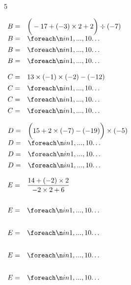 \documentclass[a4paper]{book}
\begin{document}
{\begin{exerciceNote}{5}
\begin{minipage}{0.30\linewidth}
            $\begin{array}{ll}
                B = & \bigg(-17+(-3)\times2+2\bigg)\div(-7) \\[1ex]
                B = & \points[10]\\[1ex]
                B = & \points[10]\\[1ex]
                B = & \points[10]
            \end{array}$
        \end{minipage}
        \hfill
        \begin{minipage}{0.30\linewidth}
            $\begin{array}{ll}
                C = & 13\times(-1)\times(-2)-(-12) \\[1ex]
                C = & \points[10] \\[1ex]
                C = & \points[10] \\[1ex]
                C = & \points[10]
            \end{array}$

            \vspace{1cm}

            $\begin{array}{ll}
                D = & \bigg(15+2\times(-7)-(-19)\bigg)\times(-5) \\[1ex]
                D = & \points[10]\\[1ex]
                D = & \points[10]\\[1ex]
                D = & \points[10]
            \end{array}$
        \end{minipage}
        \hfill
        \begin{minipage}[t]{0.30\linewidth}
            $\begin{array}{ll}
                E = & \dfrac{14+(-2)\times2}{-2\times2+6} \\ \\[2ex]
                E = & \points[10] \\ \\[2ex]
                E = & \points[10] \\ \\[2ex]
                E = & \points[10] \\ \\[2ex]
                E = & \points[10] 
            \end{array}$
        \end{minipage}
    \end{exerciceNote}


}
\end{document}

